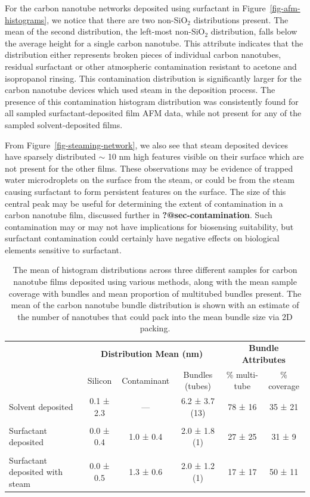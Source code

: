 \documentclass[
  a4paper,
]{scrbook}
\begin{document}
For the carbon nanotube networks deposited using surfactant in
Figure~\ref{fig-afm-histograms}, we notice that there are two
non-SiO\(_2\) distributions present. The mean of the second
distribution, the left-most non-SiO\(_2\) distribution, falls below the
average height for a single carbon nanotube. This attribute indicates
that the distribution either represents broken pieces of individual
carbon nanotubes, residual surfactant or other atmospheric contamination
resistant to acetone and isopropanol rinsing. This contamination
distribution is significantly larger for the carbon nanotube devices
which used steam in the deposition process. The presence of this
contamination histogram distribution was consistently found for all
sampled surfactant-deposited film AFM data, while not present for any of
the sampled solvent-deposited films.

From Figure~\ref{fig-steaming-network}, we also see that steam deposited
devices have sparsely distributed \(\sim\) 10 nm high features visible
on their surface which are not present for the other films. These
observations may be evidence of trapped water microdroplets on the
surface from the steam, or could be from the steam causing surfactant to
form persistent features on the surface. The size of this central peak
may be useful for determining the extent of contamination in a carbon
nanotube film, discussed further in \textbf{?@sec-contamination}. Such
contamination may or may not have implications for biosensing
suitability, but surfactant contamination could certainly have negative
effects on biological elements sensitive to surfactant.

\hypertarget{tbl-histogram-parameters}{}
\begin{table}
\caption{\label{tbl-histogram-parameters}The mean of histogram distributions across three different samples for
carbon nanotube films deposited using various methods, along with the
mean sample coverage with bundles and mean proportion of multitubed
bundles present. The mean of the carbon nanotube bundle distribution is
shown with an estimate of the number of nanotubes that could pack into
the mean bundle size via 2D packing. }\tabularnewline

\centering
\begin{tabular}{>{\raggedright\arraybackslash}p{2cm}ccccc}
\toprule
\multicolumn{1}{c}{\textbf{ }} & \multicolumn{3}{c}{\textbf{Distribution Mean (nm)}} & \multicolumn{2}{c}{\textbf{Bundle Attributes}} \\
\cmidrule(l{3pt}r{3pt}){2-4} \cmidrule(l{3pt}r{3pt}){5-6}
 & Silicon & Contaminant & Bundles (tubes) & \% multi-tube & \% coverage\\
\midrule
Solvent deposited & 0.1 ± 2.3 & — & 6.2 ± 3.7 (13) & 78 ± 16 & 35 ± 21\\
 &  &  &  &  \vphantom{1} & \\
Surfactant deposited & 0.0 ± 0.4 & 1.0 ± 0.4 & 2.0 ± 1.8 (1) & 27 ± 25 & 31 ± 9\\
 &  &  &  &  & \\
Surfactant deposited with steam & 0.0 ± 0.5 & 1.3 ± 0.6 & 2.0 ± 1.2 (1) & 17 ± 17 & 50 ± 11\\
\bottomrule
\end{tabular}
\end{table}
\end{document}
